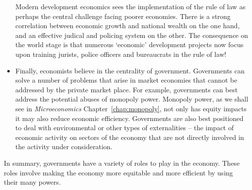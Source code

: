 \begin{itemize}
\medskip
Modern development economics sees the implementation of the rule of law as
perhaps the central challenge facing poorer economies. There is a strong 
correlation between economic growth and national wealth on the one hand, and
an effective judical and policing system on the other. The consequence on
the world stage is that numerous `economic' development projects now focus
upon training jurists, police officers and bureaucrats in the rule of law!

\item Finally, economists believe in the centrality of government.
Governments can solve a number of problems that arise in market economies
that cannot be addressed by the private market place. For example,
governments can best address the potential abuses of monopoly power.
Monopoly power, as we shall see in \textit{Microeconomics} Chapter~\ref{chap:monopoly}, not
only has equity impacts it may also reduce economic efficiency. Governments
are also best positioned to deal with environmental or other types of
externalities -- the impact of economic activity on sectors of the economy
that are not directly involved in the activity under consideration. 
\end{itemize}

In summary, governments have a variety of roles to play in the economy.
These roles involve making the economy more equitable and more efficient by
using their many powers.